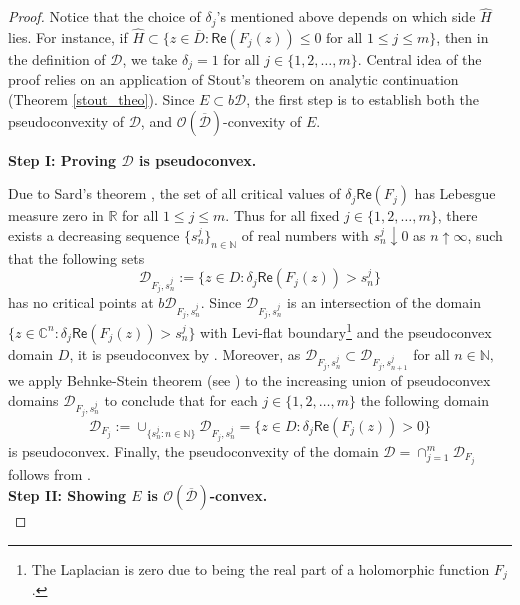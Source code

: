 \documentclass[12pt,reqno, a4paper]{amsart}
\theoremstyle{definition}
\theoremstyle{definition}
\numberwithin{equation}{section}
\def\R{\mathbb{R}}                              %
\def\C{\mathbb{C}}                              %
\def\N{\mathbb{N}}
\begin{document}
\begin{proof}
Notice that the choice of $\delta_j$'s mentioned above depends on which side $\widehat{H}$ lies. For instance, if $\widehat{H} \subset \{z\in \overline{D}: \textsf{Re}(F_j(z))\leq0 \text{ for all }1\leq j\leq m\}$, then in the definition of $\mathcal{D}$, we take $\delta_j=1$ for all $j\in  \{1,2,\ldots, m\}$. Central idea of the proof relies on an application of Stout's theorem on analytic continuation (Theorem \ref{stout_theo}). Since $E \subset b\mathcal{D}$, the first step is to establish both the pseudoconvexity of $\mathcal{D}$, and  $\mathcal{O}(\overline{\mathcal{D}})$-convexity of $E.$ \\
	\vspace*{-.3cm} 
	
	\noindent\textbf{Step I: Proving $\mathcal{D}$ is pseudoconvex.}\\
	
	\vspace*{-.3cm} 
	
	Due to Sard's theorem \cite[Theorem 6.1]{milnor}, the set of all
	critical values of $\delta_j\textsf{Re}(F_j)$ has Lebesgue measure zero in $\R$ for all $1\leq j\leq m$. Thus for all fixed ${j\in \{1,2,\ldots, m\}}$, there exists a decreasing sequence $\{s_n^j\}_{n\in \N}$ of real numbers with $s_n^j\downarrow 0$ as $n \uparrow \infty$, such that the following sets 
	$$\mathcal{D}_{F_j,s_n^j}:=\{z \in D: \delta_j\textsf{Re}(F_j(z))>s_n^j\}$$ has no critical points at $b \mathcal{D}_{F_j,s_n^j}$. Since $\mathcal{D}_{F_j,s_n^j}$ is an intersection of the domain ${\{z \in \C^n: \delta_j\textsf{Re}(F_j(z))>s_n^j\}}$ with Levi-flat boundary\footnote{The Laplacian is zero due to being the real part of a holomorphic function $F_j$.} and the pseudoconvex domain $D$, it is pseudoconvex by \cite[Corollary 3.4.7]{kra}. Moreover, as ${\mathcal{D}_{F_j,s_n^j}\subset \mathcal{D}_{F_j,s_{n+1}^j}}$ for all $n\in \N,$ we apply Behnke-Stein theorem (see \cite{beh-ste}) to the increasing union of pseudoconvex domains $\mathcal{D}_{F_j,s_n^j}$ to conclude that for each ${j\in \{1,2,\ldots,m\}}$ the following domain $$\mathcal{D}_{F_j}:=\cup_{\{s_n^j:n\in \N\}}\mathcal{D}_{F_j,s_n^j}=\{z \in D: \delta_j\textsf{Re}(F_j(z))>0\}$$ is pseudoconvex. Finally, the pseudoconvexity of the domain $\mathcal{D}= \cap_{j=1}^m \mathcal{D}_{F_j}$ follows from {\cite[Corollary 3.4.7]{kra}}.\\
	
	
	\noindent	\textbf{Step II:  Showing $E$ is $\mathcal{O}(\overline{\mathcal{D}})$-convex.}\\
	

\end{proof}
\end{document}
